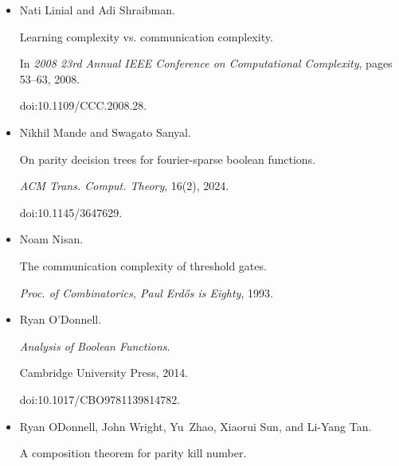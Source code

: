 \begin{itemize}
Troy Lee, Adi Shraibman, and Robert Špalek.


A direct product theorem for discrepancy.


In \emph{2008 23rd Annual IEEE Conference on Computational
Complexity}, pages 71–80, 2008.


doi:10.1109/CCC.2008.25.





\item[] 
[42]

Nati Linial and Adi Shraibman.


Learning complexity vs. communication complexity.


In \emph{2008 23rd Annual IEEE Conference on Computational
Complexity}, pages 53–63, 2008.


doi:10.1109/CCC.2008.28.





\item[] 
[43]

Nikhil Mande and Swagato Sanyal.


On parity decision trees for fourier-sparse boolean functions.


\emph{ACM Trans. Comput. Theory}, 16(2), 2024.


doi:10.1145/3647629.





\item[] 
[44]

Noam Nisan.


The communication complexity of threshold gates.


\emph{Proc. of Combinatorics, Paul Erdős is Eighty}, 1993.





\item[] 
[45]

Ryan O’Donnell.


\emph{Analysis of Boolean Functions}.


Cambridge University Press, 2014.


doi:10.1017/CBO9781139814782.





\item[] 
[46]

Ryan ODonnell, John Wright, Yu Zhao, Xiaorui Sun, and Li-Yang Tan.


A composition theorem for parity kill number.



\end{itemize}
